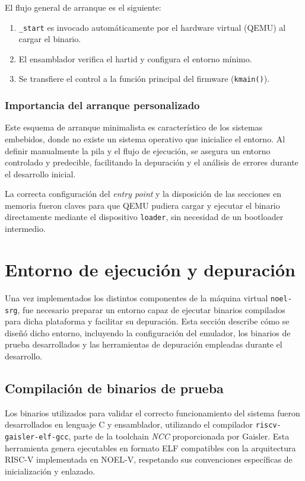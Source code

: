 El flujo general de arranque es el siguiente:

\begin{enumerate}
    \item \texttt{\_start} es invocado automáticamente por el hardware virtual (QEMU) al cargar el binario.
    \item El ensamblador verifica el hartid y configura el entorno mínimo.
    \item Se transfiere el control a la función principal del firmware (\texttt{kmain()}).
\end{enumerate}

\subsubsection*{Importancia del arranque personalizado}

Este esquema de arranque minimalista es característico de los sistemas embebidos, donde no existe un sistema operativo que inicialice el entorno. Al definir manualmente la pila y el flujo de ejecución, se asegura un entorno controlado y predecible, facilitando la depuración y el análisis de errores durante el desarrollo inicial.

La correcta configuración del \emph{entry point} y la disposición de las secciones en memoria fueron claves para que QEMU pudiera cargar y ejecutar el binario directamente mediante el dispositivo \texttt{loader}, sin necesidad de un bootloader intermedio.


\section{Entorno de ejecución y depuración}
\label{sec:entorno-ejecucion}

Una vez implementados los distintos componentes de la máquina virtual \texttt{noel-srg}, fue necesario preparar un entorno capaz de ejecutar binarios compilados para dicha plataforma y facilitar su depuración. Esta sección describe cómo se diseñó dicho entorno, incluyendo la configuración del emulador, los binarios de prueba desarrollados y las herramientas de depuración empleadas durante el desarrollo.

\subsection*{Compilación de binarios de prueba}

Los binarios utilizados para validar el correcto funcionamiento del sistema fueron desarrollados en lenguaje C y ensamblador, utilizando el compilador \texttt{riscv-gaisler-elf-gcc}, parte de la toolchain \emph{NCC} proporcionada por Gaisler. Esta herramienta genera ejecutables en formato ELF compatibles con la arquitectura RISC-V implementada en NOEL-V, respetando sus convenciones específicas de inicialización y enlazado.


